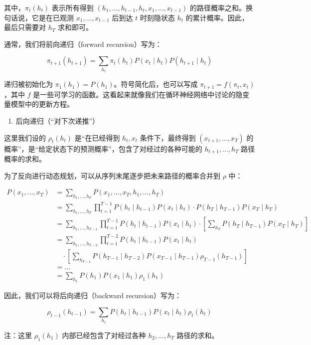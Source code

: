 其中，\(\pi_t(h_t)\) 表示所有得到 \((h_1, \ldots, h_{t-1}, h_t, x_1, \ldots, x_{t-1})\) 的路径概率之和。换句话说，它是在已观测 \(x_1, \ldots, x_{t-1}\) 后到达 \(t\) 时刻隐状态 \(h_t\) 的累计概率。因此，最后只需要对 \(h_T\) 求和即可。

通常，我们将前向递归（forward recursion）写为：

\[
\pi_{t+1}(h_{t+1}) = \sum_{h_t}\pi_t(h_t)P(x_t \mid h_t)P(h_{t+1} \mid h_t)
\]

递归被初始化为 \(\pi_1(h_1) = P(h_1)\)。符号简化后，也可以写成 \(\pi_{t+1} = f(\pi_t, x_t)\)，其中 \(f\) 是一些可学习的函数。这看起来就像我们在循环神经网络中讨论的隐变量模型中的更新方程。

\begin{enumerate}
\def\labelenumi{\arabic{enumi}.}
\setcounter{enumi}{1}
\tightlist
\item
  后向递归（``对下次递推''）
\end{enumerate}

这里我们设的 \(\rho_t(h_t)\) 是``在已经得到 \(h_t, x_t\) 条件下，最终得到 \((x_{t+1}, \ldots, x_T)\) 的概率''，是``给定状态下的预测概率''，包含了对经过的各种可能的 \(h_{t+1}, \ldots, h_T\) 路径概率的求和。

为了反向进行动态规划，可以从序列末尾逐步把未来路径的概率合并到 \(\rho\) 中：

\[
\begin{aligned}
P(x_1, \ldots, x_T)
&= \sum_{h_1,\ldots,h_T} P(x_1, \ldots, x_T, h_1, \ldots, h_T) \\
&= \sum_{h_1,\ldots,h_T}\prod_{t=1}^{T-1}P(h_t \mid h_{t-1})P(x_t \mid h_t)\cdot P(h_T \mid h_{T-1})P(x_T \mid h_T) \\
&= \sum_{h_1,\ldots,h_{T-1}}\prod_{t=1}^{T-1}P(h_t \mid h_{t-1})P(x_t \mid h_t)\cdot \left[\sum_{h_T}P(h_T \mid h_{T-1})P(x_T \mid h_T)\right] \\
&= \sum_{h_1,\ldots,h_{T-2}}\prod_{t=1}^{T-2}P(h_t \mid h_{t-1})P(x_t \mid h_t) \\
&\quad {}\cdot \left[\sum_{h_{T-1}}P(h_{T-1} \mid h_{T-2})P(x_{T-1} \mid h_{T-1})\rho_{T-1}(h_{T-1})\right] \\
&= \ldots \\
&= \sum_{h_1}P(h_1)P(x_1 \mid h_1)\rho_1(h_1)
\end{aligned}
\]

因此，我们可以将后向递归（backward recursion）写为：

\[
\rho_{t-1}(h_{t-1}) = \sum_{h_t}P(h_t \mid h_{t-1})P(x_t \mid h_t)\rho_t(h_t)
\]

注：这里 \(\rho_1(h_1)\) 内部已经包含了对经过各种 \(h_2, \ldots, h_T\) 路径的求和。

